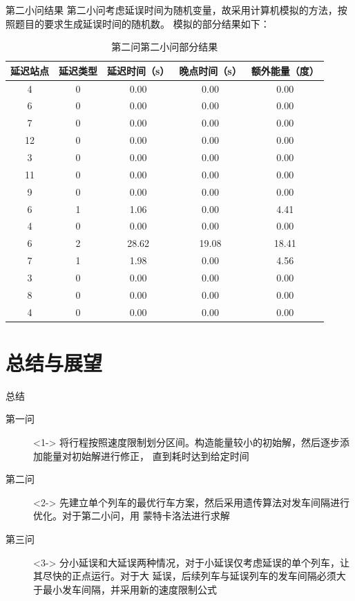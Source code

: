 \documentclass{beamer}
\begin{document}
\begin{frame}{第二小问结果}
第二小问考虑延误时间为随机变量，故采用计算机模拟的方法，按照题目的要求生成延误时间的随机数。
模拟的部分结果如下：
\begin{table}\tiny
  \centering
  \caption{第二问第二小问部分结果}
  \begin{tabular}{ccccc}
     \hline
    延迟站点&	延迟类型&	延迟时间（s）&	晚点时间（s）&	额外能量（度） \\
    \hline
    4&	0&	0.00&	0.00&	0.00\\
    6&	0&	0.00&	0.00&	0.00\\
    7&	0&	0.00&	0.00&	0.00\\
    12&	0&	0.00&	0.00&	0.00\\
    3&	0&	0.00&	0.00&	0.00\\
    11&	0&	0.00&	0.00&	0.00\\
    9&	0&	0.00&	0.00&	0.00\\
    6&	1&	1.06&	0.00&	4.41\\
    4&	0&	0.00&	0.00&	0.00\\
    6&	2&	28.62&	19.08&	18.41\\
    7&	1&	1.98&	0.00&	4.56\\
    3&	0&	0.00&	0.00&	0.00\\
    8&	0&	0.00&	0.00&	0.00\\
    4&	0&	0.00&	0.00&	0.00\\
     \hline
   \end{tabular}
\end{table}


\end{frame}

\section{总结与展望}
\begin{frame}{总结}
\begin{description}
  \item[第一问]<1-> 将行程按照速度限制划分区间。构造能量较小的初始解，然后逐步添加能量对初始解进行修正，
  直到耗时达到给定时间
  \item[第二问]<2-> 先建立单个列车的最优行车方案，然后采用遗传算法对发车间隔进行优化。对于第二小问，用
  蒙特卡洛法进行求解
  \item[第三问]<3-> 分小延误和大延误两种情况，对于小延误仅考虑延误的单个列车，让其尽快的正点运行。对于大
延误，后续列车与延误列车的发车间隔必须大于最小发车间隔，并采用新的速度限制公式
\end{description}

\end{frame}
\end{document}
